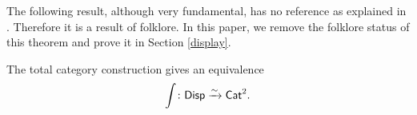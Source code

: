 The following result, although very fundamental, has no reference as explained in \cite{Abramsky}. Therefore it is a result of folklore. In this paper, we remove the folklore status of this theorem and prove it in Section \ref{display}.
\begin{thm}
The total category construction gives an equivalence 
\[ \int \colon \mathsf{Disp} \xrightarrow{\sim} \mathsf{Cat}^2.\]
\end{thm}


